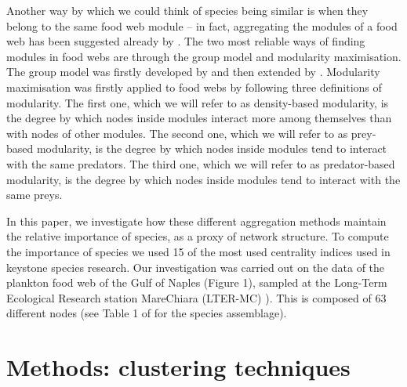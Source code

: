 \documentclass[twocolumn]{article}
\begin{document}
    \par Another way by which we could think of species being similar is when they belong to the same food web module – in fact, aggregating the modules of a food web has been suggested already by \citet{Allesina2009a}. The two most reliable ways of finding modules in food webs are through the group model and modularity maximisation. The group model was firstly developed by \citet{Allesina2009a} and then extended by \citet{Sander2015}. Modularity maximisation was firstly applied to food webs by \citet{Guimera2010} following three definitions of modularity. The first one, which we will refer to as density-based modularity, is the degree by which nodes inside modules interact more among themselves than with nodes of other modules. The second one, which we will refer to as prey-based modularity, is the degree by which nodes inside modules tend to interact with the same predators. The third one, which we will refer to as predator-based modularity, is the degree by which nodes inside modules tend to interact with the same preys.
    \par In this paper, we investigate how these different aggregation methods maintain the relative importance of species, as a proxy of network structure. To compute the importance of species we used 15 of the most used centrality indices used in keystone species research. Our investigation was carried out on the data of the plankton food web of the Gulf of Naples (Figure 1), sampled at the Long-Term Ecological Research station MareChiara (LTER-MC) \citep{RiberadAlcala2004}). This is composed of 63 different nodes (see Table 1 of \citet{DAlelio2016} for the species assemblage). 
\section*{Methods: clustering techniques}
\end{document}
